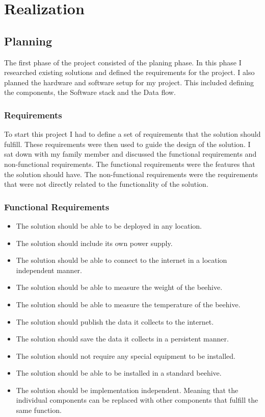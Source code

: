 \chapter{Realization}

\section{Planning}
The first phase of the project consisted of the planing phase. In this phase I researched existing solutions and defined the requirements for the project. I also planned the hardware and software setup for my project. This included defining the components, the \Gls{Software stack} and the \Gls{Data flow}.

\subsection{Requirements}
To start this project I had to define a set of requirements that the solution should fulfill. These requirements were then used to guide the design of the solution. I sat down with my family member and discussed the \gls{functional requirements} and \gls{non-functional requirements}. The functional requirements were the features that the solution should have. The non-functional requirements were the requirements that were not directly related to the functionality of the solution.

\newpage
\subsection{Functional Requirements}
\begin{itemize}
    \item The solution should be able to be deployed in any location.
    \item The solution should include its own power supply.
    \item The solution should be able to connect to the internet in a location independent manner.
    \item The solution should be able to measure the weight of the beehive.
    \item The solution should be able to measure the temperature of the beehive.
    \item The solution should publish the data it collects to the internet.
    \item The solution should save the data it collects in a persistent manner.
    \item The solution should not require any special equipment to be installed.
    \item The solution should be able to be installed in a standard beehive.
    \item The solution should be implementation independent. Meaning that the individual components can be replaced with other components that fulfill the same function.
\end{itemize}
